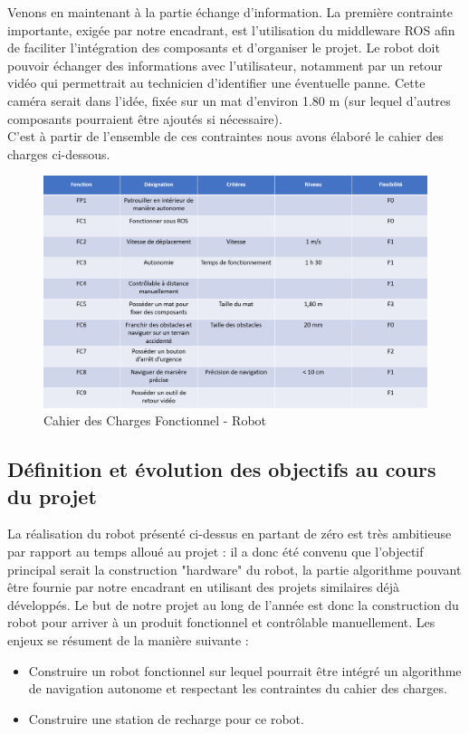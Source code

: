 \documentclass[french]{rapportENSTAB}
\begin{document}
Venons en maintenant à la partie échange d'information. La première contrainte importante, exigée par notre encadrant, est l'utilisation du middleware ROS afin de faciliter l'intégration des composants et d'organiser le projet. Le robot doit pouvoir échanger des informations avec l'utilisateur, notamment par un retour vidéo qui permettrait au technicien d'identifier une éventuelle panne. Cette caméra serait dans l'idée, fixée sur un mat d'environ 1.80 m (sur lequel d'autres composants pourraient être ajoutés si nécessaire).\\

C'est à partir de l'ensemble de ces contraintes nous avons élaboré le cahier des charges ci-dessous. \\


\begin{figure}[H]
    \centering
    \includegraphics[scale=0.5]{images/robot/cahier_charge_robot.png}
    \caption{Cahier des Charges Fonctionnel - Robot}
    \label{fig:cdcf}
\end{figure}


\subsection{Définition et évolution des objectifs au cours du projet}

La réalisation du robot présenté ci-dessus en partant de zéro est très ambitieuse par rapport au temps alloué au projet : il a donc été convenu que l'objectif principal serait la construction "hardware" du robot, la partie algorithme pouvant être fournie par notre encadrant en utilisant des projets similaires déjà développés. Le but de notre projet au long de l'année est donc la construction du robot pour arriver à un produit  fonctionnel et contrôlable manuellement. Les enjeux se résument de la manière suivante :  \begin{itemize}[label=\textbullet, font=\small\color{blue}]
    \item Construire un robot fonctionnel sur lequel pourrait être intégré un algorithme de navigation autonome et respectant les contraintes du cahier des charges.
    \item Construire une station de recharge pour ce robot.
\end{itemize}   \\ 
\end{document}
